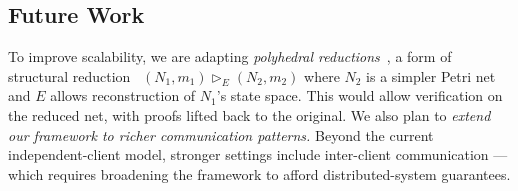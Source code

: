 \subsection{Future Work}
To improve scalability, we are adapting \textit{polyhedral reductions}~\cite{AmBeDa21}, a form of structural reduction~\cite{Be87,BeLeDa20} $(N_1, m_1) \vartriangleright_E (N_2, m_2)$ where $N_2$ is a simpler Petri net and $E$ allows reconstruction of $N_1$’s state space. This would allow verification on the reduced net, with proofs lifted back to the original.
%
We also plan to \textit{extend our framework to richer communication patterns.} Beyond the current independent-client model, stronger settings include inter-client communication ---
which requires 
broadening the framework to afford distributed-system guarantees.
%
%
%
%
%
%
%
%
%


